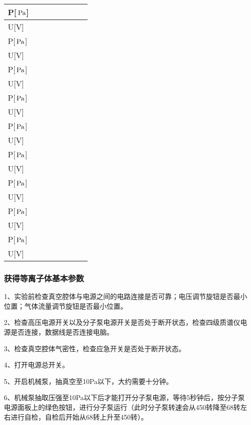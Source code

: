 \documentclass{ctexart}
\begin{document}
\begin{tabular}{|p{4em}|p{4em}|p{4em}|p{4em}|p{4em}|p{4em}|p{4em}|}
  \hline
  P[$\,\mathrm{Pa}$] &\, &\, &\, &\, &\, &\, \\
  \hline
  U[V] &\,&\,&\,&\,&\,&\,\\
  \hline
  P[$\,\mathrm{Pa}$] &\, &\, &\, &\, &\, &\, \\
  \hline
  U[V] &\,&\,&\,&\,&\,&\,\\
  \hline
  P[$\,\mathrm{Pa}$] &\, &\, &\, &\, &\, &\, \\
  \hline
  U[V] &\,&\,&\,&\,&\,&\,\\
  \hline
  P[$\,\mathrm{Pa}$] &\, &\, &\, &\, &\, &\, \\
  \hline
  U[V] &\,&\,&\,&\,&\,&\,\\
  \hline
  P[$\,\mathrm{Pa}$] &\, &\, &\, &\, &\, &\, \\
  \hline
  U[V] &\,&\,&\,&\,&\,&\,\\
  \hline
  P[$\,\mathrm{Pa}$] &\, &\, &\, &\, &\, &\, \\
  \hline
  U[V] &\,&\,&\,&\,&\,&\,\\
  \hline
  P[$\,\mathrm{Pa}$] &\, &\, &\, &\, &\, &\, \\
  \hline
  U[V] &\,&\,&\,&\,&\,&\,\\
  \hline
  P[$\,\mathrm{Pa}$] &\, &\, &\, &\, &\, &\, \\
  \hline
  U[V] &\,&\,&\,&\,&\,&\,\\
  \hline
  P[$\,\mathrm{Pa}$] &\, &\, &\, &\, &\, &\, \\
  \hline
  U[V] &\,&\,&\,&\,&\,&\,\\
  \hline
  
\end{tabular}

\subsubsection{获得等离子体基本参数}
1、实验前检查真空腔体与电源之间的电路连接是否可靠；电压调节旋钮是否最小位置；气体流量调节旋钮是否最小位置。

2、检查高压电源开关以及分子泵电源开关是否处于断开状态，检查四级质谱仪电源是否连接，数据线是否连接电脑。

3、检查真空腔体气密性，检查应急开关是否处于断开状态。

4、打开电源总开关。

5、开启机械泵，抽真空至10Pa以下，大约需要十分钟。

6、机械泵抽取压强至10Pa以下后才能打开分子泵电源，等待5秒钟后，按分子泵电源面板上的绿色按钮，进行分子泵运行（此时分子泵转速会从450转降至68转左右进行自检，自检后开始从68转上升至450转）。
\end{document}

